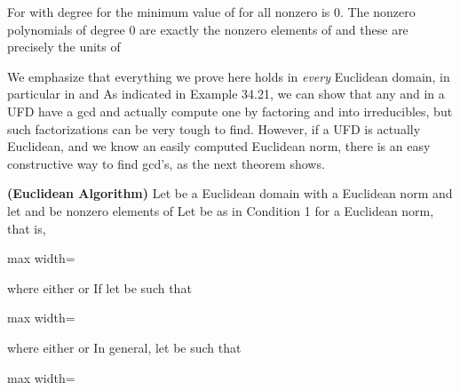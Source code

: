 \documentclass[11pt,oneside]{article}
\begin{document}
\begin{BookBody}
 For  with degree  for  the minimum value of  for all nonzero  is 0. The nonzero polynomials of degree 0 are exactly the nonzero elements of  and these are precisely the units of \BookEnd{\blacktriangle}

We emphasize that everything we prove here holds in\textit{ every} Euclidean domain, in particular in  and  As indicated in Example 34.21, we can show that any  and  in a UFD have a gcd and actually compute one by factoring  and  into irreducibles, but such factorizations can be very tough to find. However, if a UFD is actually Euclidean, and we know an easily computed Euclidean norm, there is an easy constructive way to find gcd’s, as the next theorem shows.

 \textbf{(Euclidean Algorithm)} Let  be a Euclidean domain with a Euclidean norm \BookInline{\nu,\allowbreak } and let  and  be nonzero elements of  Let  be as in Condition 1 for a Euclidean norm, that is, 

\begin{center}\begin{adjustbox}{max width=\linewidth}\BookInline{\displaystyle =}\end{adjustbox}\end{center}

\noindent where either  or  If  let  be such that

\begin{center}\begin{adjustbox}{max width=\linewidth}\end{adjustbox}\end{center}

\noindent where either  or  In general, let  be such that

\begin{center}\begin{adjustbox}{max width=\linewidth}\end{adjustbox}\end{center}


\end{BookBody}
\end{document}
